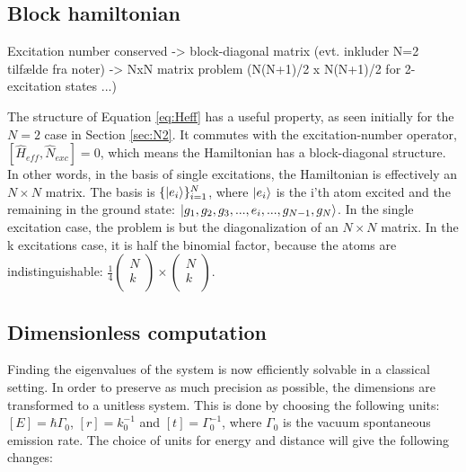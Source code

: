 \documentclass{article}
\begin{document}
\subsection{Block hamiltonian}\label{sec:block}

Excitation number conserved -> block-diagonal matrix (evt. inkluder N=2 tilfælde fra noter) -> NxN matrix problem (N(N+1)/2 x N(N+1)/2 for 2-excitation states ...)

The structure of Equation \ref{eq:Heff} has a useful property, as seen initially for the $N=2$ case in Section \ref{sec:N2}. It commutes with the excitation-number operator, $[\hat{H}_{eff}, \hat{N}_{exc}] = 0$, which means the Hamiltonian has a block-diagonal structure. In other words, in the basis of single excitations, the Hamiltonian is effectively an $N \times N$ matrix. The basis is $\{ \ket{e_i} \}_{i=1}^N$, where $\ket{e_i}$ is the i'th atom excited and the remaining in the ground state: $\ket{g_1, g_2, g_3, ..., e_i, ..., g_{N-1}, g_N}$. In the single excitation case, the problem is but the diagonalization of an $N \times N$ matrix. In the k excitations case, it is half the binomial factor, because the atoms are indistinguishable: $\frac{1}{4} \begin{pmatrix} N \\ k \\ \end{pmatrix} \times \begin{pmatrix} N \\ k \\ \end{pmatrix}$.

\subsection{Dimensionless computation}\label{sec:dimless}

Finding the eigenvalues of the system is now efficiently solvable in a classical setting. In order to preserve as much precision as possible, the dimensions are transformed to a unitless system. This is done by choosing the following units: $[E]=\hbar \Gamma_0$, $[r] = k_0^{-1}$ and $[t] = \Gamma_0^{-1}$, where $\Gamma_0$ is the vacuum spontaneous emission rate. The choice of units for energy and distance will give the following changes: 
\end{document}
